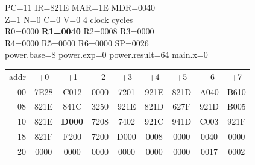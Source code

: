 \begin{tcolorbox}[stepbox, title={Step 35 \hfill PC 10 \quad LD R1, power.result}]
PC=11 IR=821E MAR=1E MDR=0040\\
Z=1 N=0 C=0 V=0 \hfill \textcolor{dim}{4 clock cycles}\\
R0=0000 \textcolor{wrt}{\textbf{R1=0040}} R2=0008 R3=0000\\
R4=0000 R5=0000 R6=0000 SP=0026\\
\textcolor{dim}{power.base=8  power.exp=0  power.result=64  main.x=0}\\[1pt]
{\setlength{\tabcolsep}{1.6pt}\begin{tabular}{@{}r*{8}{c}@{}}
\textcolor{dim}{addr} & \textcolor{dim}{+0} & \textcolor{dim}{+1} & \textcolor{dim}{+2} & \textcolor{dim}{+3} & \textcolor{dim}{+4} & \textcolor{dim}{+5} & \textcolor{dim}{+6} & \textcolor{dim}{+7}\\
\textcolor{dim}{00} & 7E28 & C012 & 0000 & 7201 & 921E & 821D & A040 & B610\\
\textcolor{dim}{08} & 821E & 841C & 3250 & 921E & 821D & 627F & 921D & B005\\
\textcolor{dim}{10} & 821E & \cellcolor{pcc}\textbf{D000} & 7208 & 7402 & 921C & 941D & C003 & 921F\\
\textcolor{dim}{18} & 821F & F200 & 7200 & D000 & \cellcolor{datac}0008 & \cellcolor{datac}0000 & \cellcolor{datac}0040 & \cellcolor{datac}0000\\
\textcolor{dim}{20} & \cellcolor{stackc}0000 & \cellcolor{stackc}0000 & \cellcolor{stackc}0000 & \cellcolor{stackc}0000 & \cellcolor{stackc}0000 & \cellcolor{stackc}0000 & \cellcolor{stackc}0017 & \cellcolor{stackc}0002\\
\end{tabular}}
\end{tcolorbox}\par\vspace{3pt}
